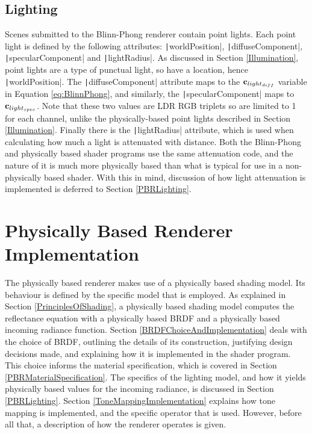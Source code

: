 \vspace{-0.4cm}

\subsection{Lighting}

Scenes submitted to the Blinn-Phong renderer contain point lights. Each point light is defined by the following attributes: \texttt|worldPosition|, \texttt|diffuseComponent|, \texttt|specularComponent| and \texttt|lightRadius|. As discussed in Section \ref{Illumination}, point lights are a type of punctual light, so have a location, hence \texttt|worldPosition|. The \texttt|diffuseComponent| attribute maps to the \begin{math}\mathbf{c}_{light_{diff}}\end{math} variable in Equation \ref{eq:BlinnPhong}, and similarly, the \texttt|specularComponent| maps to \begin{math}\mathbf{c}_{light_{spec}}\end{math}. Note that these two values are LDR RGB triplets so are limited to 1 for each channel, unlike the physically-based point lights described in Section \ref{Illumination}. Finally there is the \texttt|lightRadius| attribute, which is used when calculating how much a light is attenuated with distance. Both the Blinn-Phong and physically based shader programs use the same attenuation code, and the nature of it is much more physically based than what is typical for use in a non-physically based shader. With this in mind, discussion of how light attenuation is implemented is deferred to Section \ref{PBRLighting}.

\section{Physically Based Renderer Implementation} \label{PBRImplementation}

The physically based renderer makes use of a physically based shading model. Its behaviour is defined by the specific model that is employed. As explained in Section \ref{PrinciplesOfShading}, a physically based shading model computes the reflectance equation with a physically based BRDF and a physically based incoming radiance function. Section \ref{BRDFChoiceAndImplementation} deals with the choice of BRDF, outlining the details of its construction, justifying design decisions made, and explaining how it is implemented in the shader program. This choice informs the material specification, which is covered in Section \ref{PBRMaterialSpecification}. The specifics of the lighting model, and how it yields physically based values for the incoming radiance, is discussed in Section \ref{PBRLighting}. Section \ref{ToneMappingImplementation} explains how tone mapping is implemented, and the specific operator that is used. However, before all that, a description of how the renderer operates is given.

